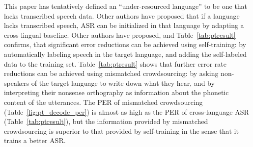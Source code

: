 This paper has tentatively defined an ``under-resourced language'' to
be one that lacks transcribed speech data.  Other authors have
proposed that if a language lacks transcribed speech, ASR can be
initialized in that language by adapting a cross-lingual baseline.
Other authors have proposed, and
Table~\ref{tab:ptresult} confirms, that significant error reductions
can be achieved using self-training: by automatically labeling speech
in the target language, and adding the self-labeled data to the
training set.  Table~\ref{tab:ptresult} shows that further error rate
reductions can be achieved using mismatched crowdsourcing: by asking
non-speakers of the target language to write down what they hear, and
by interpreting their nonsense orthography as information about the
phonetic content of the utterances.  The PER of mismatched
crowdsourcing (Table~\ref{fig:pt_decode_per}) is almost as high as the
PER of cross-language ASR (Table~\ref{tab:ptresult}), but the
information provided by mismatched crowdsourcing is superior to that
provided by self-training in the sense that it trains a better ASR.

